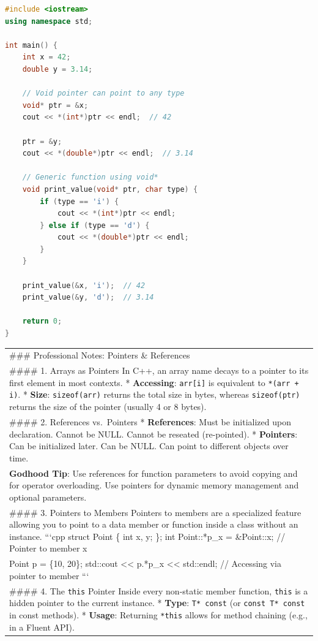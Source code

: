 \begin{lstlisting}[language={C++}]
#include <iostream>
using namespace std;

int main() {
    int x = 42;
    double y = 3.14;
    
    // Void pointer can point to any type
    void* ptr = &x;
    cout << *(int*)ptr << endl;  // 42
    
    ptr = &y;
    cout << *(double*)ptr << endl;  // 3.14
    
    // Generic function using void*
    void print_value(void* ptr, char type) {
        if (type == 'i') {
            cout << *(int*)ptr << endl;
        } else if (type == 'd') {
            cout << *(double*)ptr << endl;
        }
    }
    
    print_value(&x, 'i');  // 42
    print_value(&y, 'd');  // 3.14
    
    return 0;
}
\end{lstlisting}

\begin{longtable}[]{@{}
  >{\raggedright\arraybackslash}p{}@{}}
\toprule
\endhead
\#\#\# Professional Notes: Pointers \& References \\
\#\#\#\# 1. Arrays as Pointers In C++, an array name decays to a pointer
to its first element in most contexts. * \textbf{Accessing}:
\passthrough{\lstinline!arr[i]!} is equivalent to
\passthrough{\lstinline!*(arr + i)!}. * \textbf{Size}:
\passthrough{\lstinline!sizeof(arr)!} returns the total size in bytes,
whereas \passthrough{\lstinline!sizeof(ptr)!} returns the size of the
pointer (usually 4 or 8 bytes). \\
\#\#\#\# 2. References vs.~Pointers * \textbf{References}: Must be
initialized upon declaration. Cannot be NULL. Cannot be reseated
(re-pointed). * \textbf{Pointers}: Can be initialized later. Can be
NULL. Can point to different objects over time. \\
\textbf{Godhood Tip}: Use references for function parameters to avoid
copying and for operator overloading. Use pointers for dynamic memory
management and optional parameters. \\
\#\#\#\# 3. Pointers to Members Pointers to members are a specialized
feature allowing you to point to a data member or function inside a
class without an instance. ```cpp struct Point \{ int x, y; \}; int
Point::*p\_x = \&Point::x; // Pointer to member x \\
Point p = \{10, 20\}; std::cout \textless\textless{} p.*p\_x
\textless\textless{} std::endl; // Accessing via pointer to member
``` \\
\#\#\#\# 4. The \passthrough{\lstinline!this!} Pointer Inside every
non-static member function, \passthrough{\lstinline!this!} is a hidden
pointer to the current instance. * \textbf{Type}:
\passthrough{\lstinline!T* const!} (or
\passthrough{\lstinline!const T* const!} in const methods). *
\textbf{Usage}: Returning \passthrough{\lstinline!*this!} allows for
method chaining (e.g., in a Fluent API). \\
\bottomrule
\end{longtable}

